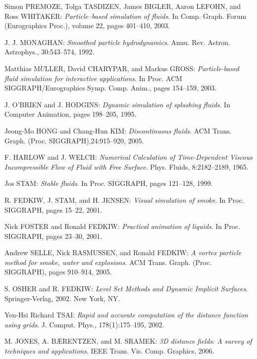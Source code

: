 \documentclass[11pt]{report}
\begin{document}
\newpage
\begin{thebibliography}{2}



Simon PREMOZE, Tolga TASDIZEN, James BIGLER, Aaron LEFOHN, and Ross WHITAKER:
\textit{Particle–based
simulation of fluids}.
In Comp. Graph. Forum (Eurographics Proc.), volume 22, pages 401–410, 2003.

J. J. MONAGHAN:
\textit{Smoothed particle hydrodynamics}.
Annu. Rev. Astron. Astrophys., 30:543–574, 1992.

Matthias M$\ddot{U}$LLER, David CHARYPAR, and Markus GROSS:
\textit{Particle-based fluid simulation for interactive
applications}.
In Proc. ACM SIGGRAPH/Eurographics Symp. Comp. Anim., pages 154–159, 2003.

J. O’BRIEN and J. HODGINS:
\textit{Dynamic simulation of splashing fluids}.
In Computer Animation, pages
198–205, 1995.

Jeong-Mo HONG and Chang-Hun KIM:
\textit{Discontinuous fluids}.
ACM Trans. Graph. (Proc. SIGGRAPH),24:915–920, 2005.

F. HARLOW and J. WELCH:
\textit{Numerical Calculation of Time-Dependent Viscous Incompressible Flow of
Fluid with Free Surface}.
Phys. Fluids, 8:2182–2189, 1965.

Jos STAM:
\textit{Stable fluids}.
In Proc. SIGGRAPH, pages 121–128, 1999.

R. FEDKIW, J. STAM, and H. JENSEN:
\textit{Visual simulation of smoke}.
In Proc. SIGGRAPH, pages 15–22, 2001.

Nick FOSTER and Ronald FEDKIW:
\textit{Practical animation of liquids}.
In Proc. SIGGRAPH, pages 23–30, 2001.

Andrew SELLE, Nick RASMUSSEN, and Ronald FEDKIW:
\textit{A vortex particle method for smoke, water and explosions}.
ACM Trans. Graph. (Proc. SIGGRAPH), pages 910–914, 2005.

S. OSHER and R. FEDKIW:
\textit{Level Set Methods and Dynamic Implicit Surfaces}.
Springer-Verlag, 2002. New York, NY.

Yen-Hsi Richard TSAI:
\textit{Rapid and accurate computation of the distance function using grids}.
J. Comput. Phys., 178(1):175–195, 2002.

M. JONES, A. B\AE RENTZEN, and M. SRAMEK:
\textit{3D distance fields: A survey of techniques and applications}.
IEEE Trans. Vis. Comp. Graphics, 2006.


\end{thebibliography}
\end{document}
